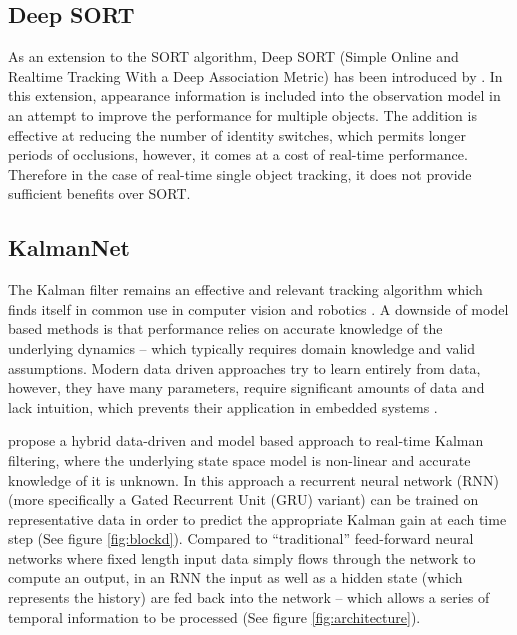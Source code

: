 \documentclass[a4paper,twoside,12pt]{report}
\begin{document}
\subsection{Deep SORT}

As an extension to the SORT algorithm, Deep SORT (Simple Online and Realtime Tracking With a Deep Association Metric) has been introduced by \cite{deepsort}. In this extension, appearance information is included into the observation model in an attempt to improve the performance for multiple objects. The addition is effective at reducing the number of identity switches, which permits longer periods of occlusions, however, it comes at a cost of real-time performance. Therefore in the case of real-time single object tracking, it does not provide sufficient benefits over SORT. 

\pagebreak
\subsection{KalmanNet}

The Kalman filter remains an effective and relevant tracking algorithm which finds itself in common use in computer vision and robotics \citep{kalmanforever}. A downside of model based methods is that performance relies on accurate knowledge of the underlying dynamics -- which typically requires domain knowledge and valid assumptions. Modern data driven approaches try to learn entirely from data, however, they have many parameters, require significant amounts of data and lack intuition, which prevents their application in embedded systems \citep{kalmannet}.

\cite{kalmannet} propose a hybrid data-driven and model based approach to real-time Kalman filtering, where the underlying state space model is non-linear and accurate knowledge of it is unknown. In this approach a recurrent neural network (RNN) (more specifically a Gated Recurrent Unit (GRU) variant) can be trained on representative data in order to predict the appropriate Kalman gain at each time step  (See figure \ref{fig:blockd}). Compared to ``traditional'' feed-forward neural networks where fixed length input data simply flows through the network to compute an output, in an RNN the input as well as a hidden state (which represents the history) are fed back into the network -- which allows a series of temporal information to be processed  (See figure \ref{fig:architecture}). 
\end{document}
